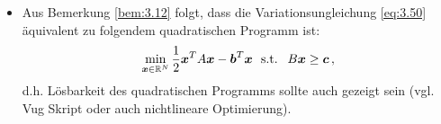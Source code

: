 \begin{itemize}
\item Aus Bemerkung \ref{bem:3.12} folgt, dass die Variationsungleichung \eqref{eq:3.50} äquivalent zu folgendem quadratischen Programm ist:
\begin{align*}
\min_{\boldsymbol x\in \mathbb{R}^N} \frac 1 2 \boldsymbol x^T A \boldsymbol x - \boldsymbol b^T \boldsymbol x \ \text{ s.t. } \ B\boldsymbol x \ge \boldsymbol c \, ,
\end{align*}
d.h. Lösbarkeit des quadratischen Programms sollte auch gezeigt sein (vgl. Vug Skript oder auch nichtlineare Optimierung).
\end{itemize}


\newpage


